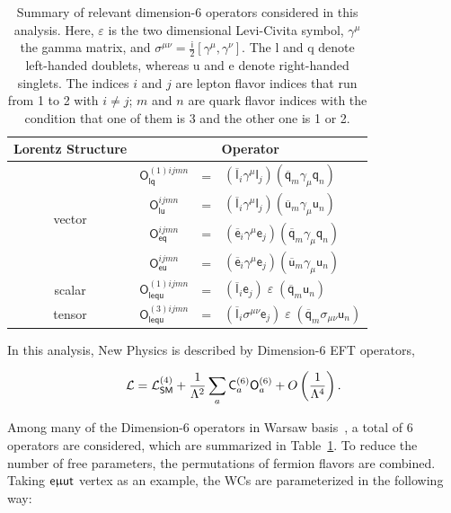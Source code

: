 \begin{table}[t]
\sffamily
\centering
\caption{Summary of relevant dimension-6 operators considered in this analysis. Here, $\varepsilon$ is the two dimensional Levi-Civita symbol, $\gamma^\mu$ the gamma matrix, and $\sigma^{\mu\nu}=\frac{\textsf{i}}{2}[\gamma^\mu,\gamma^\nu]$. The l and q denote left-handed doublets, whereas u and e denote right-handed singlets. The indices $i$ and $j$ are lepton flavor indices that run from 1 to 2 with $i \neq j$; $m$ and $n$ are quark flavor indices with the condition that one of them is 3 and the other one is 1 or 2.}
\begin{tabular}{cccl}
\toprule
Lorentz Structure & \multicolumn{3}{c}{Operator}\\
\midrule
\multirow{4}{*}{vector} & $\textsf{O}_{\textsf{lq}}^{(1)ijmn}$ &=& $(\overline{\textsf{l}}_i\gamma^\mu\textsf{l}_j)
 (\overline{\textsf{q}}_m\gamma_\mu\textsf{q}_n)$
 \\
 & $\textsf{O}_{\textsf{lu}}^{ijmn}$ &=& $(\overline{\textsf{l}}_i\gamma^\mu\textsf{l}_j)
 (\overline{\textsf{u}}_m\gamma_\mu\textsf{u}_n)$
 \\  
 & $\textsf{O}_{\textsf{eq}}^{ijmn}$ &=& $(\overline{\textsf{e}}_i\gamma^\mu\textsf{e}_j)
 (\overline{\textsf{q}}_m\gamma_\mu\textsf{q}_n)$
 \\ 
 & $\textsf{O}_{\textsf{eu}}^{ijmn}$ &=& $(\overline{\textsf{e}}_i\gamma^\mu\textsf{e}_j)
 (\overline{\textsf{u}}_m\gamma_\mu\textsf{u}_n)$
 \\ \midrule
\multirow{1}{*}{scalar} & $\textsf{O}_{\textsf{lequ}}^{(1)ijmn}$ &=& $(\overline{\textsf{l}}_i\textsf{e}_j)\;\varepsilon\;
 (\overline{\textsf{q}}_m\textsf{u}_n)$
 \\ 
 \multirow{1}{*}{tensor} & $\textsf{O}_{\textsf{lequ}}^{(3)ijmn}$ &=& $(\overline{\textsf{l}}_i \sigma^{\mu\nu}\textsf{e}_j)\;\varepsilon\;
 (\overline{\textsf{q}}_m\sigma_{\mu\nu}\textsf{u}_n)$
 \\ \bottomrule
\end{tabular}
\label{tab:dimension6}
\end{table}

In this analysis, New Physics is described by Dimension-6 \ac{EFT} operators,

\begin{equation}
\label{eq:0}
\mathcal{L}=\mathcal{L}_{\textsf{SM}}^{(4)} + \frac{1}{\mathrm{\Lambda}^2}\sum_{a}\textsf{C}^{(6)}_{a}\textsf{O}^{(6)}_{a}+O\left( \frac{1}{\mathrm{\Lambda}^4}\right).
\end{equation}  

Among many of the Dimension-6 operators in Warsaw basis~\cite{Grzadkowski:2010es,Aguilar-Saavedra:2018ksv}, a total of 6 operators are considered, which are summarized in Table~\ref{tab:dimension6}. To reduce the number of free parameters, the permutations of fermion flavors are combined. Taking $\textsf{e}\upmu\textsf{{u}t}$ vertex as an example, the \acp{WC} are parameterized in the following way:

